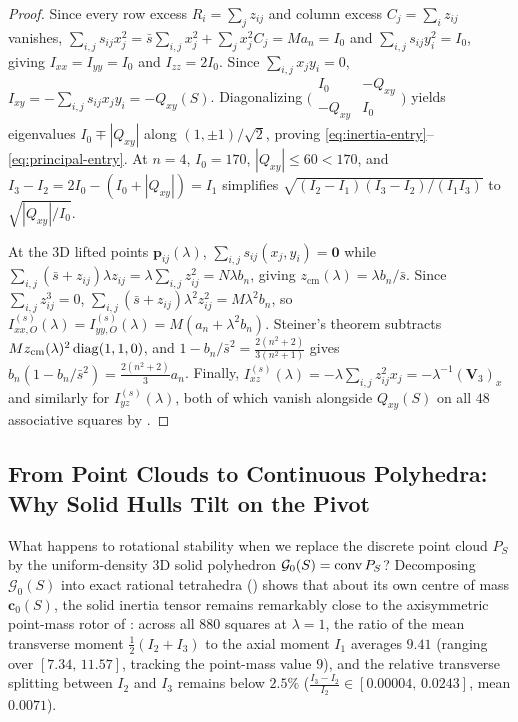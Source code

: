 \begin{proof}
Since every row excess $R_i=\sum_jz_{ij}$ and column excess $C_j=\sum_iz_{ij}$ vanishes, $\sum_{i,j}s_{ij}x_j^2=\bar s\sum_{i,j}x_j^2+\sum_jx_j^2C_j=M a_n=I_0$ and $\sum_{i,j}s_{ij}y_i^2=I_0$, giving $I_{xx}=I_{yy}=I_0$ and $I_{zz}=2I_0$. Since $\sum_{i,j}x_jy_i=0$, $I_{xy}=-\sum_{i,j}s_{ij}x_jy_i=-Q_{xy}(S)$. Diagonalizing $\bigl(\begin{smallmatrix}I_0 & -Q_{xy}\\ -Q_{xy} & I_0\end{smallmatrix}\bigr)$ yields eigenvalues $I_0\mp|Q_{xy}|$ along $(1,\pm1)/\sqrt{2}$, proving \eqref{eq:inertia-entry}--\eqref{eq:principal-entry}. At $n=4$, $I_0=170$, $|Q_{xy}|\le 60 < 170$, and $I_3-I_2=2I_0-(I_0+|Q_{xy}|)=I_1$ simplifies $\sqrt{(I_2-I_1)(I_3-I_2)/(I_1I_3)}$ to $\sqrt{|Q_{xy}|/I_0}$.

At the 3D lifted points $\mathbf p_{ij}(\lambda)$, $\sum_{i,j}s_{ij}(x_j,y_i)=\mathbf 0$ while $\sum_{i,j}(\bar s+z_{ij})\lambda z_{ij}=\lambda\sum_{i,j}z_{ij}^2=N\lambda b_n$, giving $z_{\mathrm{cm}}(\lambda)=\lambda b_n/\bar s$. Since $\sum_{i,j}z_{ij}^3=0$, $\sum_{i,j}(\bar s+z_{ij})\lambda^2z_{ij}^2=M\lambda^2b_n$, so $I_{xx,O}^{(s)}(\lambda)=I_{yy,O}^{(s)}(\lambda)=M(a_n+\lambda^2b_n)$. Steiner's theorem subtracts $Mz_{\mathrm{cm}}(\lambda)^2\operatorname{diag}(1,1,0)$, and $1-b_n/\bar s^2=\frac{2(n^2+2)}{3(n^2+1)}$ gives $b_n(1-b_n/\bar s^2)=\frac{2(n^2+2)}{3}a_n$. Finally, $I_{xz}^{(s)}(\lambda)=-\lambda\sum_{i,j}z_{ij}^2x_j=-\lambda^{-1}(\mathbf V_3)_x$ and similarly for $I_{yz}^{(s)}(\lambda)$, both of which vanish alongside $Q_{xy}(S)$ on all $48$ associative squares by .
\end{proof}

\subsection{From Point Clouds to Continuous Polyhedra: Why Solid Hulls Tilt on the Pivot}

What happens to rotational stability when we replace the discrete point cloud $P_S$ by the uniform-density 3D solid polyhedron $\mathcal G_0(S)=\operatorname{conv} P_S$? Decomposing $\mathcal G_0(S)$ into exact rational tetrahedra () shows that about its own centre of mass $\mathbf c_0(S)$, the solid inertia tensor remains remarkably close to the axisymmetric point-mass rotor of : across all $880$ squares at $\lambda=1$, the ratio of the mean transverse moment $\frac12(I_2+I_3)$ to the axial moment $I_1$ averages $9.41$ (ranging over $[7.34,\,11.57]$, tracking the point-mass value $9$), and the relative transverse splitting between $I_2$ and $I_3$ remains below $2.5\%$ ($\frac{I_3-I_2}{I_2}\in[0.00004,\,0.0243]$, mean $0.0071$).

